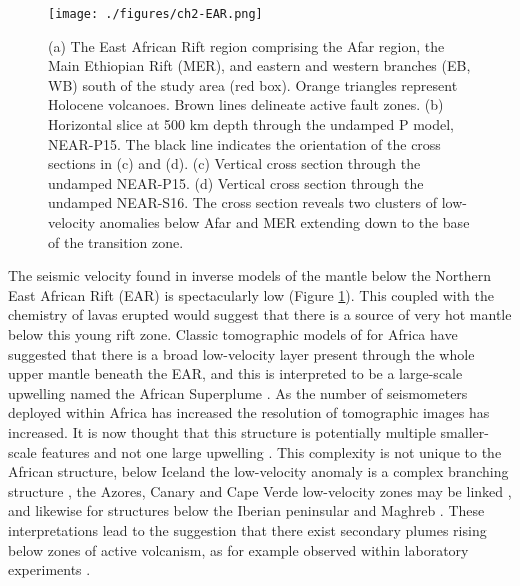 \begin{figure}
    \centering
    \texttt{[image: ./figures/ch2-EAR.png]}
    \caption{(a) The East African Rift region comprising the Afar region, the Main Ethiopian Rift (MER), and eastern and western branches (EB, WB) south of the study area (red box). Orange triangles represent Holocene volcanoes. Brown lines delineate active fault zones. (b) Horizontal slice at 500 km depth through the undamped P model, NEAR-P15. The black line indicates the orientation of the cross sections in (c) and (d). (c) Vertical cross section through the undamped NEAR-P15. (d) Vertical cross section through the undamped NEAR-S16. The cross section reveals two clusters of low-velocity anomalies below Afar and MER extending down to the base of the transition zone.}
    \label{fg:EAR}
\end{figure}

The seismic velocity found in inverse models of the mantle below the Northern East African Rift (EAR) is spectacularly low (Figure \ref{fg:EAR}). This coupled with the chemistry of lavas erupted would suggest that there is a source of very hot mantle below this young rift zone. Classic tomographic models of for Africa have suggested that there is a broad low-velocity layer present through the whole upper mantle beneath the EAR, and this is interpreted to be a large-scale upwelling named the African Superplume \citep[e.g.][]{ritsema-etal-1999}. As the number of seismometers deployed within Africa has increased the resolution of tomographic images has increased. It is now thought that this structure is potentially multiple smaller-scale features and not one large upwelling \citep{chang-2011,hammond-etal-2013,civiero-etal-2015,emry-etal-2019}. This complexity is not unique to the African structure, below Iceland the low-velocity anomaly is a complex branching structure \citep{rickers-etal-2013}, the Azores, Canary and Cape Verde low-velocity zones may be linked \citep{saki-etal-2015}, and likewise for structures below the Iberian peninsular and Maghreb \citep{civiero-etal-2018}. These interpretations lead to the suggestion that there exist secondary plumes rising below zones of active volcanism, as for example observed within laboratory experiments \citep{davaille-2005,kumagai-etal-2007}.

